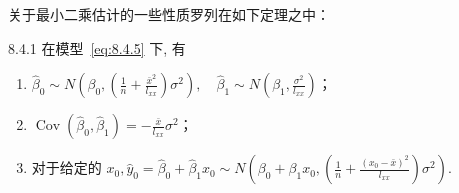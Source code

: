 关于最小二乘估计的一些性质罗列在如下定理之中：
\begin{theorem}{}{8.4.1}
在模型~\ref{eq:8.4.5} 下, 有
\begin{enumerate}
  \item  $\hat{\beta}_{0} \sim N \left(\beta_{0}, \left(\frac{1}{n} + \frac{\bar{x}^{2}}{l_{xx}} \right)\sigma^2\right), \quad \hat{\beta}_{1} \sim N \left(\beta_{1}, \frac{\sigma^{2}}{l_{xx}} \right)$；\label{thm8.4.1.1}
  \item ${\operatorname{Cov}\left(\hat{\beta}_{0}, \hat{\beta}_{1}\right)=-\frac{\bar{x}}{l_{x x}}\sigma^2}$；\label{thm8.4.1.2}
  \item 对于给定的  $x_{0}, \hat{y}_{0}=\hat{\beta}_{0}+\hat{\beta}_{1} x_{0} \sim N\left(\beta_{0}+\beta_{1} x_{0},\left(\frac{1}{n}+\frac{\left(x_{0}-\bar{x}\right)^{2}}{l_{x x}}\right)\sigma^2\right) $.\label{thm8.4.1.3}
\end{enumerate}


\end{theorem}
